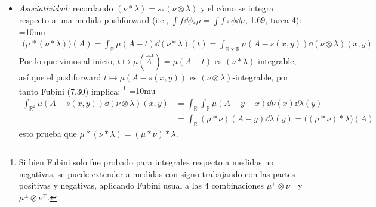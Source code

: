 \begin{sol}
\begin{enumerate}[label=(\roman*)]
\begin{itemize}
\item\emph{Asociatividad:} recordando $(\nu*\lambda) = s_*(\nu\otimes\lambda)$ y el cómo se integra respecto a una medida pushforward (i.e., $\int f\dd{\phi_*\mu} = \int f\circ \phi \dd{\mu}$, 1.69, tarea 4):
{\thickmuskip=10mu
\begin{align*}
\bigl(\mu*(\nu*\lambda)\bigr)(A) 
= \int_{\mathbb{R}} \mu(A-t) \dd{(\nu*\lambda)(t)}
= \int_{\mathbb{R\times\mathbb{R}}} \mu(A-s(x,y)) \dd{(\nu\otimes\lambda)(x,y)}
\end{align*}}%
Por lo que vimos al inicio, $t\mapsto \mu(\hat{A}^t) = \mu(A-t)$ es $(\nu*\lambda)$-integrable, así que el pushforward $t \mapsto \mu(A-s(x,y))$ es $(\nu\otimes\lambda)$-integrable, por tanto Fubini (7.30) implica:%
\footnote{
    Si bien Fubini solo fue probado para integrales respecto a medidas no negativas, se puede extender a medidas con signo trabajando con las partes positivas y negativas, aplicando Fubini usual a las 4 combinaciones $\mu^\pm\otimes\nu^\pm$ y $\mu^\pm\otimes\nu^\mp$.
}
{\thickmuskip=10mu
\begin{align*}
\int_{\mathbb{R}^2} \mu(A-s(x,y)) \dd{(\nu\otimes\lambda)(x,y)}
&= \int_{\mathbb{R}}\int_{\mathbb{R}} \mu(A-y-x) \dd{\nu(x)}\dd{\lambda(y)}\\
&= \int_{\mathbb{R}}(\mu*\nu)(A-y)\dd{\lambda(y)}
= \bigl((\mu*\nu)*\lambda\bigr)(A)
\end{align*}}%
esto prueba que $\mu*(\nu*\lambda) = (\mu*\nu)*\lambda$.


\end{itemize}
\end{enumerate}
\end{sol}
